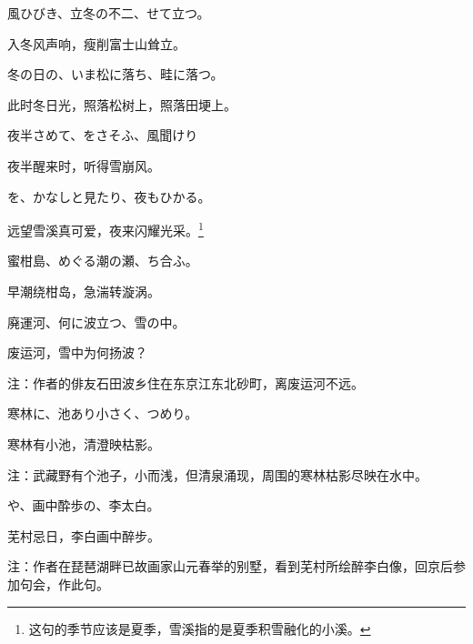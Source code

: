 \setcounter{haikucounter}{0}

\begin{haiku}
    {\FH 風ひびき、立冬の不二、せて立つ。}

    {\FK 入冬风声响，瘦削富士山耸立。}
\end{haiku}

\begin{haiku}
    {\FH 冬の日の、いま松に落ち、畦に落つ。}

    {\FK 此时冬日光，照落松树上，照落田埂上。}
\end{haiku}

\begin{haiku}
    {\FH 夜半さめて、をさそふ、風聞けり}

    {\FK 夜半醒来时，听得雪崩风。}
\end{haiku}

\begin{haiku}
    {\FH {}を、かなしと見たり、夜もひかる。}

    {\FK 远望雪溪真可爱，夜来闪耀光采。\footnote{\FT 这句的季节应该是夏季，雪溪指的是夏季积雪融化的小溪。}}
\end{haiku}

\begin{haiku}
    {\FH 蜜柑島、めぐる潮の瀬、ち合ふ。}

    {\FK 早潮绕柑岛，急湍转漩涡。}
\end{haiku}

\begin{haiku}
    {\FH 廃運河、何に波立つ、雪の中。}

    {\FK 废运河，雪中为何扬波？}

    {\FT 注：作者的俳友石田波乡住在东京江东北砂町，离废运河不远。}
\end{haiku}

\begin{haiku}
    {\FH 寒林に、池あり小さく、つめり。}

    {\FK 寒林有小池，清澄映枯影。}

    {\FT 注：武藏野有个池子，小而浅，但清泉涌现，周围的寒林枯影尽映在水中。}
\end{haiku}

\begin{haiku}
    {\FH {}や、画中酔歩の、李太白。}

    {\FK 芜村忌日，李白画中醉步。}

    {\FT 注：作者在琵琶湖畔已故画家山元春举的别墅，看到芜村所绘醉李白像，回京后参加句会，作此句。}
\end{haiku}

